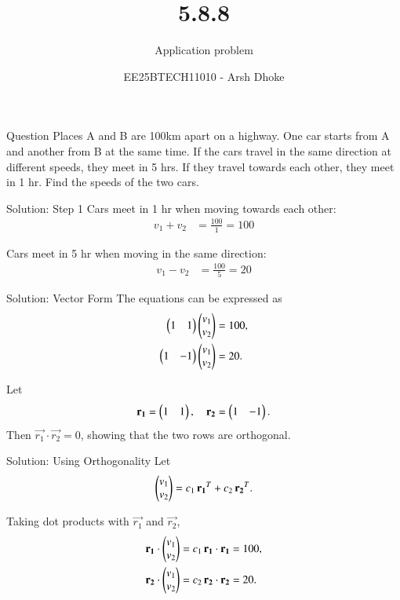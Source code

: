 \documentclass{beamer}
\title{5.8.8}
\subtitle{Application problem}
\author{EE25BTECH11010 - Arsh Dhoke}
\date{}
\begin{document}
\begin{frame}
  \titlepage
\end{frame}
\begin{frame}{Question}
Places A and B are 100km apart on a highway. One car starts from A and another from B at the same time. 
If the cars travel in the same direction at different speeds, they meet in 5 hrs. 
If they travel towards each other, they meet in 1 hr. 
Find the speeds of the two cars.
\end{frame}

\begin{frame}{Solution: Step 1}
Cars meet in 1 hr when moving towards each other:
\begin{align}
v_1 + v_2 &= \frac{100}{1} = 100
\end{align}

Cars meet in 5 hr when moving in the same direction:
\begin{align}
v_1 - v_2 &= \frac{100}{5} = 20
\end{align}
\end{frame}

\begin{frame}{Solution: Vector Form}
The equations can be expressed as
\begin{align}
\begin{pmatrix}1 & 1\end{pmatrix}\begin{pmatrix}v_1 \\ v_2\end{pmatrix} &= 100, \\
\begin{pmatrix}1 & -1\end{pmatrix}\begin{pmatrix}v_1 \\ v_2\end{pmatrix} &= 20.
\end{align}

Let 
\begin{align}
\mathbf{r_1} = \begin{pmatrix}1 & 1\end{pmatrix}, \quad \mathbf{r_2} = \begin{pmatrix}1 & -1\end{pmatrix}.
\end{align}
Then $\vec{r_1} \cdot \vec{r_2} = 0$, showing that the two rows are orthogonal.
\end{frame}

\begin{frame}{Solution: Using Orthogonality}
Let
\begin{align}
\begin{pmatrix}v_1 \\ v_2\end{pmatrix} = c_1\,\mathbf{r_1}^{T} + c_2\,\mathbf{r_2}^{T}.
\end{align}

Taking dot products with $\vec{r_1}$ and $\vec{r_2}$,
\begin{align}
\mathbf{r_1}\cdot\begin{pmatrix}v_1 \\ v_2\end{pmatrix} &= c_1\,\mathbf{r_1}\cdot\mathbf{r_1} = 100, \\
\mathbf{r_2}\cdot\begin{pmatrix}v_1 \\ v_2\end{pmatrix} &= c_2\,\mathbf{r_2}\cdot\mathbf{r_2} = 20.
\end{align}
\end{frame}
\end{document}
